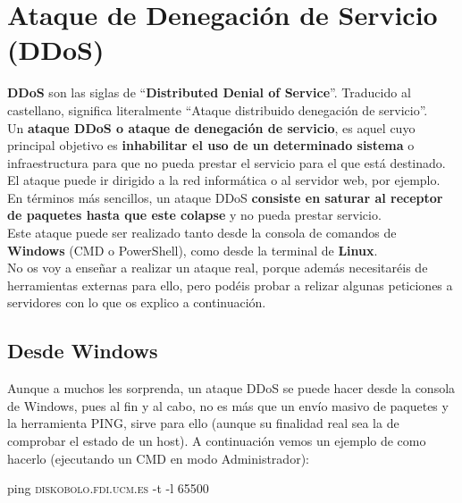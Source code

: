 \newpage
\section{Ataque de Denegación de Servicio (DDoS)}
\textbf{DDoS} son las siglas de “\textbf{Distributed Denial of Service}”. Traducido al castellano, significa literalmente “Ataque distribuido denegación de servicio”.
\newline \\
Un \textbf{ataque DDoS o ataque de denegación de servicio}, es aquel cuyo principal objetivo es \textbf{inhabilitar el uso de un determinado sistema} o infraestructura para que no pueda prestar el servicio para el que está destinado. 
El ataque puede ir dirigido a la red informática o al servidor web, por ejemplo.
\newline\\
\noindent
En términos más sencillos, un ataque DDoS \textbf{consiste en saturar al receptor de paquetes hasta que este colapse} y no pueda prestar servicio.
\newline\\
\noindent
Este ataque puede ser realizado tanto desde la consola de comandos de \textbf{Windows} (CMD o PowerShell), como desde la terminal de \textbf{Linux}.\\
No os voy a enseñar a realizar un ataque real, porque además necesitaréis de herramientas externas para ello, pero podéis probar a relizar algunas peticiones a servidores con lo que os explico a continuación.

\subsection{Desde Windows}
Aunque a muchos les sorprenda, un ataque DDoS se puede hacer desde la consola de Windows, pues al fin y al cabo, no es más que un envío masivo de paquetes y la herramienta \textsc{PING}, sirve para ello (aunque su finalidad real sea la de comprobar el estado de un host).
\newline
A continuación vemos un ejemplo de como hacerlo (ejecutando un CMD en modo Administrador):

\begin{tcolorbox}[colframe=black!75!blue]
 \begin{center}
    ping \textsc{diskobolo.fdi.ucm.es} -t -l 65500
 \end{center}
\end{tcolorbox}

